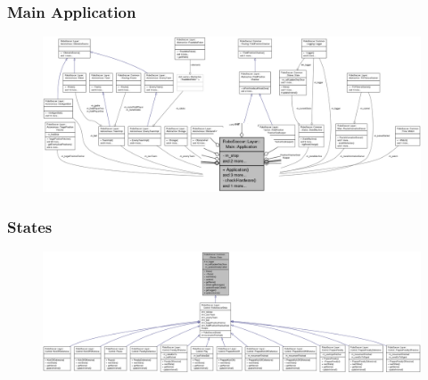 \documentclass[hyperref={pdfpagelabels=false},compress]{beamer}
\begin{document}
\begin{frame}
	\frametitle{Main Application}
	\center
	\begin{figure}
		\centering
		\includegraphics[width = \textwidth]{collaboration_graph_application_zoomed.png}
	\end{figure}
\end{frame}

\begin{frame}
	\frametitle{States}
	\center
	\begin{figure}
		\centering
		\includegraphics[width = \textwidth]{inheritance_graph_states.png}
	\end{figure}
\end{frame}
\end{document}
